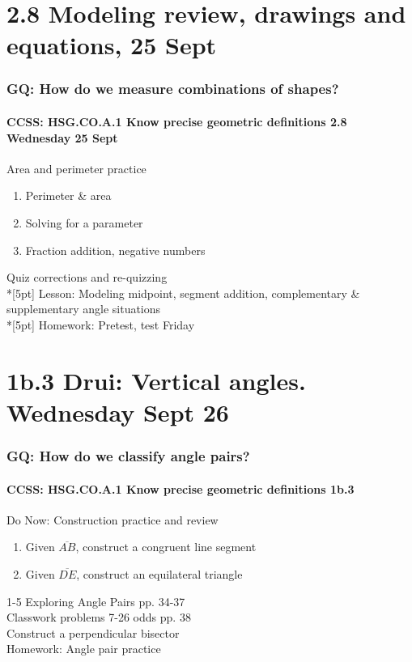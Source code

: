 \documentclass{beamer}
\begin{document}
    \section{2.8 Modeling review, drawings and equations, 25 Sept}
    \frame
    {
      \frametitle{GQ: How do we measure combinations of shapes?}
      \framesubtitle{CCSS: HSG.CO.A.1 Know precise geometric definitions \hfill \alert{2.8 Wednesday 25 Sept}}
  
      \begin{block}{Area and perimeter practice}
      \begin{enumerate}
        \item Perimeter \& area
        \item Solving for a parameter
        \item Fraction addition, negative numbers
      \end{enumerate}
      \end{block}
      Quiz corrections and re-quizzing \\*[5pt]
      Lesson: Modeling midpoint, segment addition, complementary \& supplementary angle situations \\*[5pt]
      Homework: Pretest, \alert{test Friday}
    }
    
\section{1b.3 Drui: Vertical angles. Wednesday Sept 26}
  \frame
  {
    \frametitle{GQ: How do we classify angle pairs?}
    \framesubtitle{CCSS: HSG.CO.A.1 Know precise geometric definitions  \alert{1b.3}}

    \begin{block}{Do Now: Construction practice and review}
    \begin{enumerate}
        \item Given $\overline{AB}$, construct a congruent line segment
        \item Given $\overline{DE}$, construct an equilateral triangle
    \end{enumerate}
    \end{block}
    1-5 Exploring Angle Pairs pp. 34-37\\
    Classwork problems 7-26 odds pp. 38\\
    Construct a perpendicular bisector \\
    \vspace{0.5cm}
    Homework: Angle pair practice
  }
\end{document}
